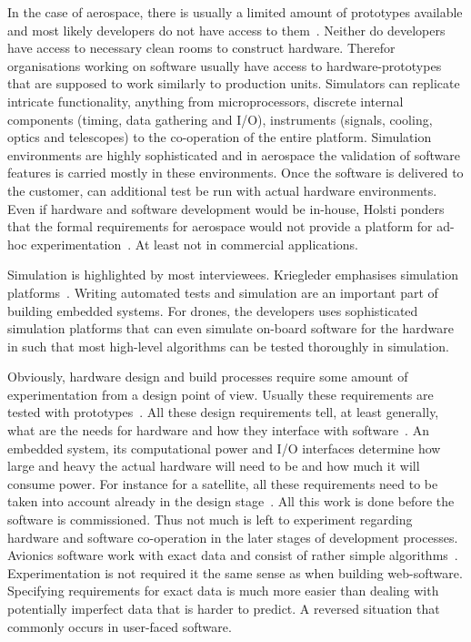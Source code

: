 \documentclass[english]{tktltiki2}
\begin{document}
In the case of aerospace, there is usually a limited amount of prototypes available and most likely developers do not have access to them~\cite{Hol15b}. Neither do developers have access to necessary clean rooms to construct hardware. Therefor organisations working on software usually have access to hardware-prototypes that are supposed to work similarly to production units. Simulators can replicate intricate functionality, anything from microprocessors, discrete internal components (timing, data gathering and I/O), instruments (signals, cooling, optics and telescopes) to the co-operation of the entire platform. Simulation environments are highly sophisticated and in aerospace the validation of software features is carried mostly in these environments. Once the software is delivered to the customer, can additional test be run with actual hardware environments. Even if hardware and software development would be in-house, Holsti ponders that the formal requirements for aerospace would not provide a platform for ad-hoc experimentation~\cite{Hol15b}. At least not in commercial applications.

Simulation is highlighted by most interviewees. Kriegleder emphasises simulation platforms~\cite{Kri15}. Writing automated tests and simulation are an important part of building embedded systems. For drones, the developers uses sophisticated simulation platforms that can even simulate on-board software for the hardware in such that most high-level algorithms can be tested thoroughly in simulation.

Obviously, hardware design and build processes require some amount of experimentation from a design point of view. Usually these requirements are tested with prototypes~\cite{BT15, Hol15a, Hol15b, Koi15, Kri15, Pet15}. All these design requirements tell, at least generally, what are the needs for hardware and how they interface with software~\cite{Hol15b}. An embedded system, its computational power and I/O interfaces determine how large and heavy the actual hardware will need to be and how much it will consume power. For instance for a satellite, all these requirements need to be taken into account already in the design stage~\cite{Hol15b}. All this work is done before the software is commissioned. Thus not much is left to experiment regarding hardware and software co-operation in the later stages of development processes. Avionics software work with exact data and consist of rather simple algorithms~\cite{Hol15b}. Experimentation is not required it the same sense as when building web-software. Specifying requirements for exact data is much more easier than dealing with potentially imperfect data that is harder to predict. A reversed situation that commonly occurs in user-faced software.
\end{document}
